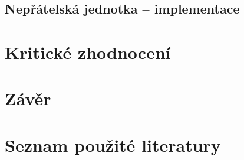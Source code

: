 \documentclass[FM,Proj]{tulthesis}
\begin{document}
	
	
	\section{Nepřátelská jednotka – implementace} %
	\label{chpFSM}
	
	
	
	 
	\chapter{Kritické zhodnocení}
	
	\chapter{Závěr}
	
	\chapter*{Seznam použité literatury}
	\printbibliography[heading=none]
	
\end{document}

